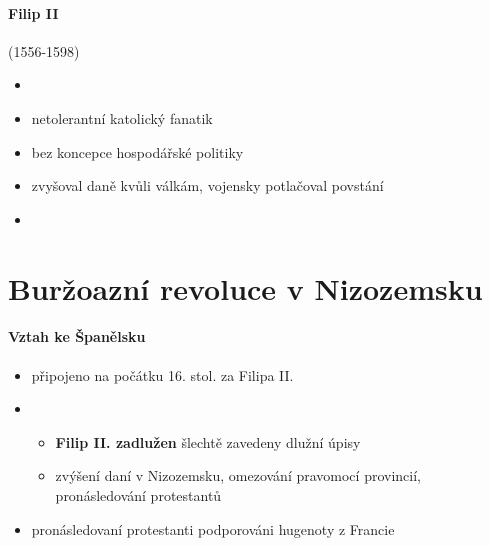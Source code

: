 \paragraph{Filip II} (1556-1598)
\begin{itemize}
\item {}
\item netolerantní katolický fanatik
\item bez koncepce hospodářské politiky
\item zvyšoval daně kvůli válkám, vojensky potlačoval povstání
\item {}
\end{itemize}

\section{Buržoazní revoluce v Nizozemsku}
\paragraph{Vztah ke Španělsku}
\begin{itemize}
\item připojeno na počátku 16. stol. za Filipa II.
\item {}
	\begin{itemize}
	\item \textbf{Filip II. zadlužen} šlechtě \ra zavedeny dlužní úpisy
	\item zvýšení daní v Nizozemsku, omezování pravomocí provincií, pronásledování protestantů
	\end{itemize}
\item pronásledovaní protestanti podporováni hugenoty z Francie
\end{itemize}

